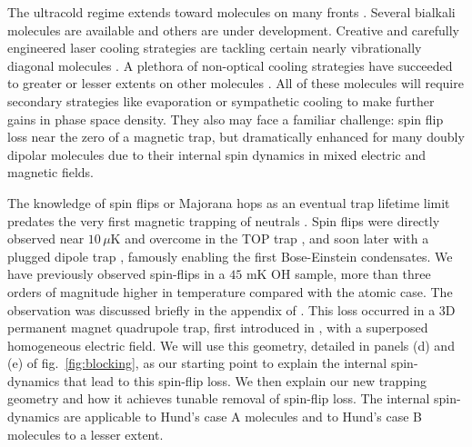 \documentclass[%
 reprint,
groupedaddress,
 amsmath,amssymb,
 aps,
prl,
]{revtex4-1}
\begin{document}
%
%
The ultracold regime extends toward molecules on many fronts \cite{Carr2009}. Several bialkali molecules are available \cite{Ni2008, Takekoshi2014, Park2015} and others are under development. Creative and carefully engineered laser cooling strategies are tackling certain nearly vibrationally diagonal molecules \cite{Steinecker2016, Barry2014, Hemmerling2016, Hummon2013, Zhelyazkova2014}. A plethora of non-optical cooling strategies have succeeded to greater or lesser extents on other molecules \cite{Doyle1998,Prehn2016,Bethlem1999,Bochinski2003,Akerman2015}. All of these molecules will require secondary strategies like evaporation or sympathetic cooling to make further gains in phase space density. They also may face a familiar challenge: spin flip loss near the zero of a magnetic trap, but dramatically enhanced for many doubly dipolar molecules due to their internal spin dynamics in mixed electric and magnetic fields. 

The knowledge of spin flips or Majorana hops as an eventual trap lifetime limit predates the very first magnetic trapping of neutrals \cite{Migdall1985}. Spin flips were directly observed near $10\,\mu\text{K}$ and overcome in the TOP trap \cite{Petrich1995}, and soon later with a plugged dipole trap \cite{Davis1995}, famously enabling the first Bose-Einstein condensates. We have previously observed spin-flips in a $45\text{ mK}$ OH sample, more than three orders of magnitude higher in temperature compared with the atomic case. The observation was discussed briefly in the appendix of \cite{Stuhl2013}. This loss occurred in a 3D permanent magnet quadrupole trap, first introduced in \cite{Sawyer2008}, with a superposed homogeneous electric field. We will use this geometry, detailed in panels (d) and (e) of fig.~\ref{fig:blocking}, as our starting point to explain the internal spin-dynamics that lead to this spin-flip loss. We then explain our new trapping geometry and how it achieves tunable removal of spin-flip loss. The internal spin-dynamics are applicable to Hund's case A molecules and to Hund's case B molecules to a lesser extent.%
\end{document}
